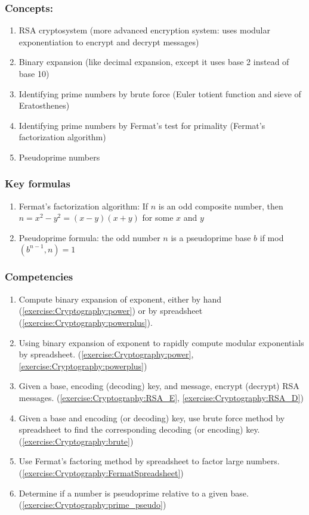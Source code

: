 \subsubsection*{Concepts:}
\begin{enumerate}
\item 
RSA cryptosystem (more advanced encryption system: uses modular exponentiation to encrypt and decrypt messages)
\item
Binary expansion (like decimal expansion, except it uses base 2 instead of base 10)
\item
Identifying prime numbers by brute force (Euler totient function and sieve of Eratosthenes)
\item
Identifying prime numbers by Fermat's test for primality (Fermat's factorization algorithm)
\item
Pseudoprime numbers
\end{enumerate}

\subsubsection*{Key formulas}
\begin{enumerate}
\item
Fermat's factorization algorithm: If $n$ is an odd composite number, then $n = x^{2} - y^{2} = (x - y)(x + y)$ for some $x$ and $y$
\item
Pseudoprime formula: the odd number $n$ is a pseudoprime base $b$ if mod$(b^{n-1},n) = 1$
\end{enumerate}

\subsubsection*{Competencies}
\begin{enumerate}
\item
Compute binary expansion of exponent, either by hand (\ref{exercise:Cryptography:power}) or by spreadsheet (\ref{exercise:Cryptography:powerplus}).
\item
Using binary expansion of exponent to rapidly compute modular exponentials by spreadsheet. (\ref{exercise:Cryptography:power}, \ref{exercise:Cryptography:powerplus})
\item
Given a base, encoding (decoding) key, and message, encrypt (decrypt) RSA messages. (\ref{exercise:Cryptography:RSA_E}, \ref{exercise:Cryptography:RSA_D})
\item
Given a base and encoding (or decoding) key, use brute force method by spreadsheet to find the corresponding decoding (or encoding) key. (\ref{exercise:Cryptography:brute})
\item
Use Fermat's factoring method by spreadsheet to factor large numbers. (\ref{exercise:Cryptography:FermatSpreadsheet})
\item
Determine if a number is pseudoprime relative to a given base. (\ref{exercise:Cryptography:prime_pseudo})
\end{enumerate}
